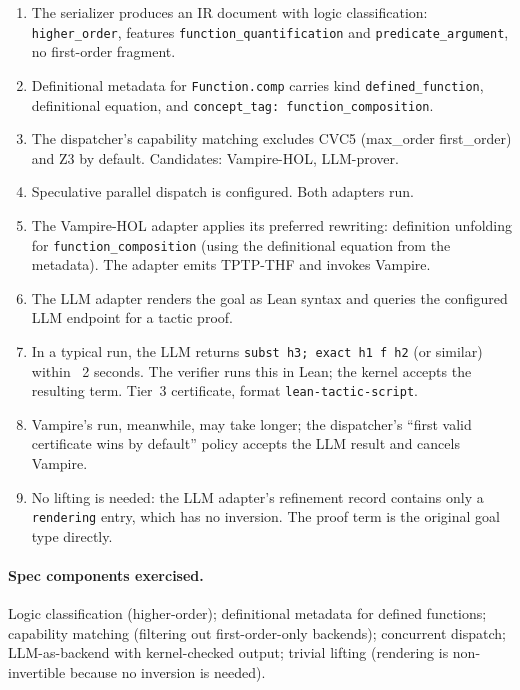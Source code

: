 \documentclass[11pt,letterpaper]{article}
\theoremstyle{definition}
\theoremstyle{remark}
\begin{document}
\begin{enumerate}[leftmargin=2em]
  \item The serializer produces an IR document with logic classification:
        \texttt{higher\_order}, features \texttt{function\_quantification}
        and \texttt{predicate\_argument}, no first-order fragment.
  \item Definitional metadata for \texttt{Function.comp} carries kind
        \texttt{defined\_function}, definitional equation, and
        \texttt{concept\_tag: function\_composition}.
  \item The dispatcher's capability matching excludes CVC5 (max\_order
        first\_order) and Z3 by default. Candidates: Vampire-HOL,
        LLM-prover.
  \item Speculative parallel dispatch is configured. Both adapters run.
  \item The Vampire-HOL adapter applies its preferred rewriting:
        definition unfolding for \texttt{function\_composition} (using
        the definitional equation from the metadata). The adapter
        emits TPTP-THF and invokes Vampire.
  \item The LLM adapter renders the goal as Lean syntax and queries the
        configured LLM endpoint for a tactic proof.
  \item In a typical run, the LLM returns
        \texttt{subst h3; exact h1 f h2} (or similar) within ~2 seconds.
        The verifier runs this in Lean; the kernel accepts the
        resulting term. Tier~3 certificate, format
        \texttt{lean-tactic-script}.
  \item Vampire's run, meanwhile, may take longer; the dispatcher's
        ``first valid certificate wins by default'' policy accepts the
        LLM result and cancels Vampire.
  \item No lifting is needed: the LLM adapter's refinement record
        contains only a \texttt{rendering} entry, which has no
        inversion. The proof term is the original goal type directly.
\end{enumerate}

\paragraph{Spec components exercised.} Logic classification (higher-order);
definitional metadata for defined functions; capability matching
(filtering out first-order-only backends); concurrent dispatch; LLM-as-backend
with kernel-checked output; trivial lifting (rendering is non-invertible
because no inversion is needed).
\end{document}
